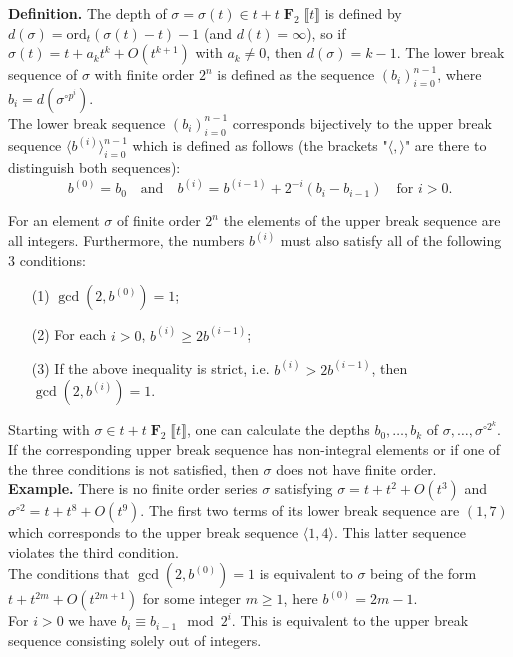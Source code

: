 \documentclass[11pt,reqno]{amsart}
\DeclareMathOperator{\F}{\mathbf{F}}
\newcommand{\fl}{\llbracket}
\newcommand{\fr}{\rrbracket}
\newcommand{\pau}[1]{\fl #1 \fr}
\begin{document}
\textbf{Definition.} The depth of $\sigma=\sigma(t)\in t+t\F_2\pau{t}$ is defined by $d(\sigma)=\text{ord}_t(\sigma(t)-t)-1$ (and $d(t)=\infty$), so if $\sigma(t)=t+a_k t^k+O(t^{k+1})$ with $a_k\neq 0$, then $d(\sigma)=k-1$. The lower break sequence of $\sigma$ with finite order $2^n$ is defined as the sequence $(b_i)_{i=0}^{n-1}$, where $b_i=d(\sigma^{\circ p^i})$.\\

The lower break sequence $(b_i)_{i=0}^{n-1}$ corresponds bijectively to the upper break sequence $\langle b^{(i)}\rangle_{i=0}^{n-1}$ which is defined as follows (the brackets "$\langle,\rangle$" are there to distinguish both sequences):
\begin{equation}
b^{(0)}=b_0\quad\text{and}\quad b^{(i)}=b^{(i-1)}+2^{-i}(b_i-b_{i-1})\quad\text{for } i>0.
\end{equation}

For an element $\sigma$ of finite order $2^n$ the elements of the upper break sequence are all integers. Furthermore, the numbers $b^{(i)}$ must also satisfy all of the following 3 conditions:
\begin{itemize}
\item[(1)] $\gcd(2,b^{(0)})=1$;
\item[(2)] For each $i>0$, $b^{(i)}\ge 2b^{(i-1)}$;
\item[(3)] If the above inequality is strict, i.e. $b^{(i)}> 2b^{(i-1)}$, then $\gcd(2,b^{(i)})=1$.
\end{itemize}

Starting with $\sigma\in t+t\F_2\pau{t}$, one can calculate the depths $b_0,\ldots,b_k$ of $\sigma,\ldots,\sigma^{\circ 2^k}$. If the corresponding upper break sequence has non-integral elements or if one of the three conditions is not satisfied, then $\sigma$ does not have finite order.\\

\textbf{Example.} There is no finite order series $\sigma$ satisfying $\sigma=t+t^2+O(t^3)$ and $\sigma^{\circ 2}=t+t^8+O(t^9)$. The first two terms of its lower break sequence are $(1,7)$ which corresponds to the upper break sequence $\langle 1,4\rangle$. This latter sequence violates the third condition.\\

The conditions that $\gcd(2,b^{(0)})=1$ is equivalent to $\sigma$ being of the form $t+t^{2m}+O(t^{2m+1})$ for some integer $m\ge 1$, here $b^{(0)}=2m-1$.\\

For $i>0$ we have $b_i\equiv b_{i-1}\mod 2^i$. This is equivalent to the upper break sequence consisting solely out of integers.
\end{document}
